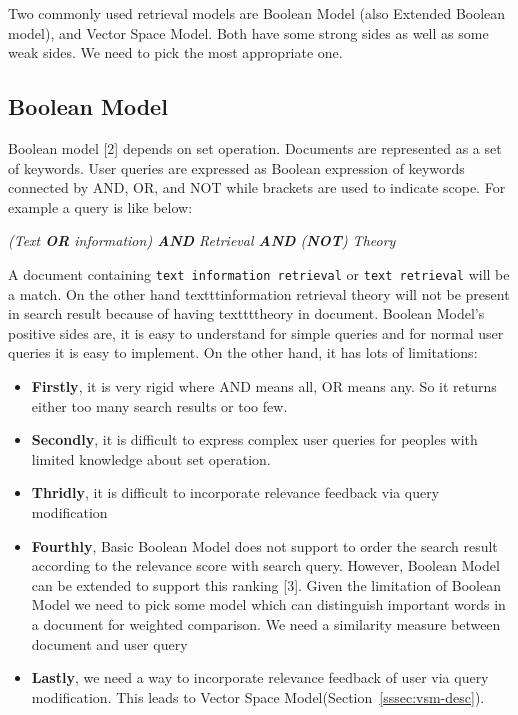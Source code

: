 \label{sec:approach}

Two commonly used retrieval models are Boolean Model (also Extended Boolean model), and
Vector Space Model. Both have some strong sides as well as some weak sides. We need to pick
the most appropriate one.

\subsection{Boolean Model}
\label{sec:boolean}
Boolean model [2] depends on set operation. Documents are represented as a set of keywords.
User queries are expressed as Boolean expression of keywords connected by AND, OR, and
NOT while brackets are used to indicate scope. For example a query is like below:

\textit{(Text \textbf{OR} information) \textbf{AND} Retrieval \textbf{AND} (\textbf{NOT}) Theory}

A document containing \texttt{text information retrieval} or \texttt{text retrieval} will be a match. On the
other hand texttt{information retrieval theory} will not be present in search result because of having
texttt{theory} in document. Boolean Model's positive sides are, it is easy to understand for simple
queries and for normal user queries it is easy to implement. On the other hand, it has lots of
limitations:
\begin{itemize}
\item \textbf{Firstly},  it is very rigid where AND means all, OR means any. So it returns either too many search results or too few.
\item \textbf{Secondly}, it is difficult to express complex user queries for peoples
with limited knowledge about set operation.
\item \textbf{Thridly},  it is difficult to incorporate relevance feedback via query modification
\item \textbf{Fourthly}, Basic Boolean Model does not support to order the search result according to the relevance score with search query. However, Boolean Model can be extended to support this ranking [3]. Given the limitation of Boolean Model we need to pick some model which can distinguish important words in a document for weighted comparison. We need a similarity measure between document and user query
\item \textbf{Lastly}, we need a way to incorporate relevance feedback of user via
query modification. This leads to Vector Space Model(Section~\ref{sssec:vsm-desc}).
\end{itemize}

